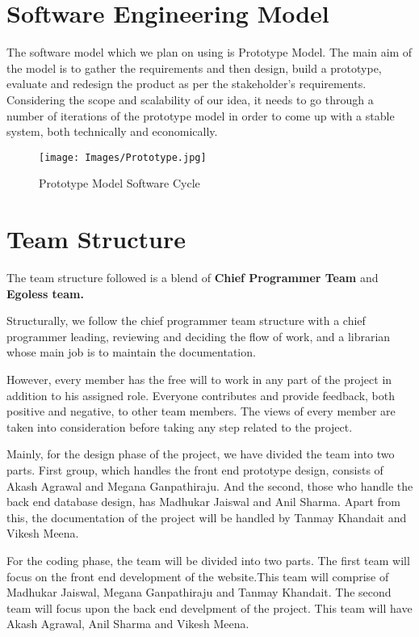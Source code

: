 \documentclass{article}
\begin{document}
\section{Software Engineering Model}
The software model which we plan on using is Prototype Model. The main aim of the model is to gather the requirements and then design, build a prototype, evaluate and redesign the product as per the stakeholder's requirements. 
Considering the scope and scalability of our idea, it needs to go through a number of iterations of the prototype model in order to come up with a stable system, both technically and economically.
  \begin{figure}[h!]
        \centering
        \texttt{[image: Images/Prototype.jpg]}
        \caption[Caption for LOF]{Prototype Model Software Cycle\footnotemark}
        \label{fig:my_label}
    \end{figure}

\section{Team Structure}
The team structure followed is a blend of \textbf{Chief Programmer Team} and \textbf{Egoless team.}
\par Structurally, we follow the chief programmer team structure with a chief programmer leading, reviewing and deciding the flow of work, and a librarian whose main job is to maintain the documentation.
\par However, every member has the free will to work in any part of the project in addition to his assigned role. Everyone contributes and provide feedback, both positive and negative, to other team members. The views of every member are taken into consideration before taking any step related to the project.

\par Mainly, for the design phase of the project, we have divided the team into two parts. First group, which handles the front end prototype design, consists of Akash Agrawal and Megana Ganpathiraju. And the second, those who handle the back end database design, has Madhukar Jaiswal and Anil Sharma. Apart from this, the documentation of the project will be handled by Tanmay Khandait and Vikesh Meena.

\par For the coding phase, the team will be divided into two parts. The first team will focus on the front end development of the website.This team will comprise of Madhukar Jaiswal, Megana Ganpathiraju and Tanmay Khandait. The second team will focus upon the back end develpment of the project. This team will have Akash Agrawal, Anil Sharma and Vikesh Meena.
\end{document}
